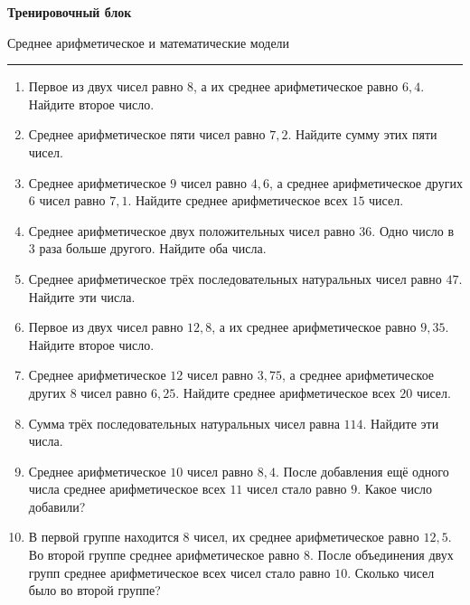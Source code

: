 \documentclass[a4paper,12pt]{article}
\begin{document}
\newpage
\thispagestyle{fancy}

\begin{center}
    {\LARGE\bfseries\color{darkaccent}Тренировочный блок}
    
    \vspace{0.3em}
    
    {\large Среднее арифметическое и математические модели}
\end{center}

\vspace{0.5em}
{\color{accent}\rule{\linewidth}{0.8pt}}

\begin{enumerate}

    \item Первое из двух чисел равно \(8\), а их среднее арифметическое равно \(6{,}4\).
    Найдите второе число.

    \item Среднее арифметическое пяти чисел равно \(7{,}2\).
    Найдите сумму этих пяти чисел.

    \item Среднее арифметическое \(9\) чисел равно \(4{,}6\), а среднее арифметическое других \(6\) чисел равно \(7{,}1\).
    Найдите среднее арифметическое всех \(15\) чисел.

    \item Среднее арифметическое двух положительных чисел равно \(36\).
    Одно число в \(3\) раза больше другого.
    Найдите оба числа.

    \item Среднее арифметическое трёх последовательных натуральных чисел равно \(47\).
    Найдите эти числа.

    \item Первое из двух чисел равно \(12{,}8\), а их среднее арифметическое равно \(9{,}35\).
    Найдите второе число.

    \item Среднее арифметическое \(12\) чисел равно \(3{,}75\), а среднее арифметическое других \(8\) чисел равно \(6{,}25\).
    Найдите среднее арифметическое всех \(20\) чисел.

    \item Сумма трёх последовательных натуральных чисел равна \(114\).
    Найдите эти числа.

    \item Среднее арифметическое \(10\) чисел равно \(8{,}4\).
    После добавления ещё одного числа среднее арифметическое всех \(11\) чисел стало равно \(9\).
    Какое число добавили?

    \item В первой группе находится \(8\) чисел, их среднее арифметическое равно \(12{,}5\).
    Во второй группе среднее арифметическое равно \(8\).
    После объединения двух групп среднее арифметическое всех чисел стало равно \(10\).
    Сколько чисел было во второй группе?

\end{enumerate}
\end{document}
